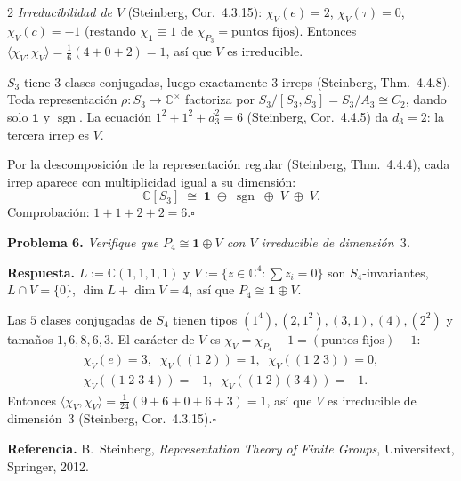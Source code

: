 \documentclass[8pt,a4paper]{extarticle}
\newcommand{\CC}{\mathbb{C}}
\newcommand{\prob}[1]{%
  \par\vspace{0.5em}
  {\normalsize\bfseries\color{repblue} Problema #1.}\;%
}
\begin{document}
\begin{multicols}{2}
\emph{Irreducibilidad de $V$} (Steinberg, Cor.~4.3.15): $\chi_V(e)=2$, $\chi_V(\tau)=0$, $\chi_V(c)=-1$ (restando $\chi_{\mathbf{1}}\equiv 1$ de $\chi_{P_3}=\text{puntos fijos}$).
Entonces $\langle\chi_V,\chi_V\rangle=\tfrac{1}{6}(4+0+2)=1$, así que $V$ es irreducible.

$S_3$ tiene $3$ clases conjugadas, luego exactamente $3$ irreps (Steinberg, Thm.~4.4.8).
Toda representación $\rho\colon S_3\to\CC^\times$ factoriza por $S_3/[S_3,S_3]=S_3/A_3\cong C_2$,
dando solo $\mathbf{1}$ y $\operatorname{sgn}$.
La ecuación $1^2+1^2+d_3^2=6$ (Steinberg, Cor.~4.4.5) da $d_3=2$: la tercera irrep es $V$.

Por la descomposición de la representación regular (Steinberg, Thm.~4.4.4), cada irrep aparece con multiplicidad igual a su dimensión:
\[
  \CC[S_3]\;\cong\;\mathbf{1}\;\oplus\;\operatorname{sgn}\;\oplus\; V\;\oplus\; V.
\]
Comprobación: $1+1+2+2=6$.\hfill$\square$

\prob{6}%
\textit{Verifique que $P_4\cong\mathbf{1}\oplus V$ con $V$ irreducible de dimensión~$3$.}

\smallskip
\textbf{Respuesta.}
$L:=\CC(1,1,1,1)$ y $V:=\{z\in\CC^4:\sum z_i=0\}$ son $S_4$-invariantes, $L\cap V=\{0\}$, $\dim L+\dim V=4$, así que $P_4\cong\mathbf{1}\oplus V$.

Las $5$ clases conjugadas de $S_4$ tienen tipos $(1^4),(2,1^2),(3,1),(4),(2^2)$ y tamaños $1,6,8,6,3$.
El carácter de $V$ es $\chi_V=\chi_{P_4}-1=(\text{puntos fijos})-1$:
\begin{gather*}
  \chi_V(e)=3,\;\;
  \chi_V((1\;2))=1,\;\;
  \chi_V((1\;2\;3))=0,\\
  \chi_V((1\;2\;3\;4))=-1,\;\;
  \chi_V((1\;2)(3\;4))=-1.
\end{gather*}
Entonces $\langle\chi_V,\chi_V\rangle=\tfrac{1}{24}(9+6+0+6+3)=1$, así que $V$ es irreducible de dimensión~$3$ (Steinberg, Cor.~4.3.15).\hfill$\square$

\smallskip
{\footnotesize\textbf{Referencia.} B.~Steinberg, \textit{Representation Theory of Finite Groups}, Universitext, Springer, 2012.}

\end{multicols}
\end{document}
